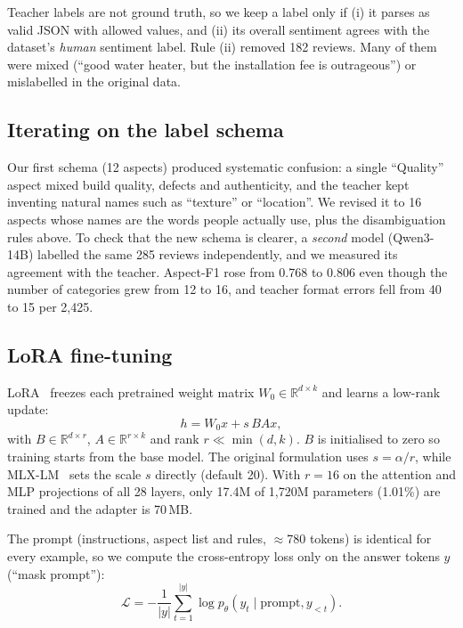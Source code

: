 \documentclass[journal]{IEEEtran}
\begin{document}
Teacher labels are not ground truth, so we keep a label only if (i) it parses as valid JSON with allowed values, and
(ii) its overall sentiment agrees with the dataset's \emph{human} sentiment label. Rule (ii) removed 182 reviews. Many
of them were mixed (``good water heater, but the installation fee is outrageous'') or mislabelled in the original data.

\subsection{Iterating on the label schema}
Our first schema (12 aspects) produced systematic confusion: a single ``Quality'' aspect mixed build quality, defects
and authenticity, and the teacher kept inventing natural names such as ``texture'' or ``location''. We revised it to 16
aspects whose names are the words people actually use, plus the disambiguation rules above. To check that the new
schema is clearer, a \emph{second} model (Qwen3-14B) labelled the same 285 reviews independently, and we measured its
agreement with the teacher. Aspect-F1 rose from 0.768 to 0.806 even though the number of categories grew from 12 to 16,
and teacher format errors fell from 40 to 15 per 2{,}425.

\subsection{LoRA fine-tuning}
LoRA~\cite{hu2022lora} freezes each pretrained weight matrix $W_0\in\mathbb{R}^{d\times k}$ and learns a low-rank update:
\begin{equation}
h = W_0 x + s\,B A x,
\label{eq:lora}
\end{equation}
with $B\in\mathbb{R}^{d\times r}$, $A\in\mathbb{R}^{r\times k}$ and rank $r\ll\min(d,k)$. $B$ is initialised to zero so training starts from the base model. The original formulation uses $s=\alpha/r$,
while MLX-LM~\cite{mlx2023,mlxlm} sets the scale $s$ directly (default 20). With $r=16$ on the attention and MLP projections
of all 28 layers, only 17.4M of 1{,}720M parameters (1.01\%) are trained and the adapter is 70\,MB.

The prompt (instructions, aspect list and rules, $\approx$780 tokens) is identical for every example, so we compute the
cross-entropy loss only on the answer tokens $y$ (``mask prompt''):
\begin{equation}
\mathcal{L} = -\frac{1}{|y|}\sum_{t=1}^{|y|}\log p_\theta\!\left(y_t \mid \text{prompt}, y_{<t}\right).
\end{equation}
\end{document}
